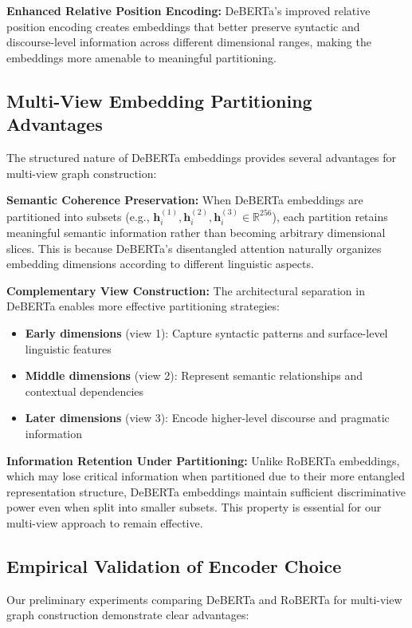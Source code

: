 \textbf{Enhanced Relative Position Encoding:} DeBERTa's improved relative position encoding creates embeddings that better preserve syntactic and discourse-level information across different dimensional ranges, making the embeddings more amenable to meaningful partitioning.

\subsection{Multi-View Embedding Partitioning Advantages}

The structured nature of DeBERTa embeddings provides several advantages for multi-view graph construction:

\textbf{Semantic Coherence Preservation:} When DeBERTa embeddings are partitioned into subsets (e.g., $\mathbf{h}_i^{(1)}, \mathbf{h}_i^{(2)}, \mathbf{h}_i^{(3)} \in \mathbb{R}^{256}$), each partition retains meaningful semantic information rather than becoming arbitrary dimensional slices. This is because DeBERTa's disentangled attention naturally organizes embedding dimensions according to different linguistic aspects.

\textbf{Complementary View Construction:} The architectural separation in DeBERTa enables more effective partitioning strategies:
\begin{itemize}
    \item \textbf{Early dimensions} (view 1): Capture syntactic patterns and surface-level linguistic features
    \item \textbf{Middle dimensions} (view 2): Represent semantic relationships and contextual dependencies  
    \item \textbf{Later dimensions} (view 3): Encode higher-level discourse and pragmatic information
\end{itemize}

\textbf{Information Retention Under Partitioning:} Unlike RoBERTa embeddings, which may lose critical information when partitioned due to their more entangled representation structure, DeBERTa embeddings maintain sufficient discriminative power even when split into smaller subsets. This property is essential for our multi-view approach to remain effective.

\subsection{Empirical Validation of Encoder Choice}

Our preliminary experiments comparing DeBERTa and RoBERTa for multi-view graph construction demonstrate clear advantages:

